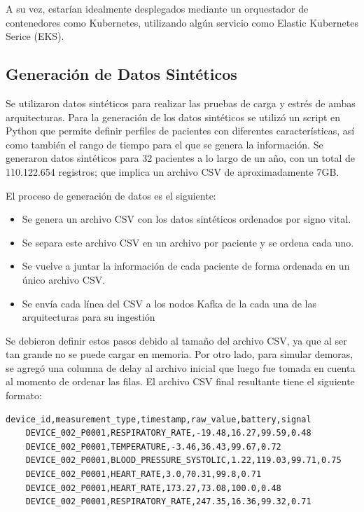 A su vez, estarían idealmente desplegados mediante un orquestador de contenedores como Kubernetes, utilizando algún servicio como Elastic Kubernetes Serice (EKS).

\newpage

\subsection{Generación de Datos Sintéticos}

Se utilizaron datos sintéticos para realizar las pruebas de carga y estrés de ambas arquitecturas.
Para la generación de los datos sintéticos se utilizó un script en Python que permite definir perfiles de pacientes con diferentes características,
así como también el rango de tiempo para el que se genera la información.
Se generaron datos sintéticos para 32 pacientes a lo largo de un año, con un total de 110.122.654 registros;
que implica un archivo CSV de aproximadamente 7GB.

El proceso de generación de datos es el siguiente:
\begin{itemize}
    \item Se genera un archivo CSV con los datos sintéticos ordenados por signo vital.
    \item Se separa este archivo CSV en un archivo por paciente y se ordena cada uno.
    \item Se vuelve a juntar la información de cada paciente de forma ordenada en un único archivo CSV.
    \item Se envía cada línea del CSV a los nodos Kafka de la cada una de las arquitecturas para su ingestión
\end{itemize}


Se debieron definir estos pasos debido al tamaño del archivo CSV, ya que al ser tan grande no se puede cargar en memoria.
Por otro lado, para simular demoras, se agregó una columna de delay al archivo inicial que luego fue tomada en cuenta al momento de ordenar las filas. 
El archivo CSV final resultante tiene el siguiente formato:
\begin{lstlisting}[language=CSV]
    device_id,measurement_type,timestamp,raw_value,battery,signal
    DEVICE_002_P0001,RESPIRATORY_RATE,-19.48,16.27,99.59,0.48
    DEVICE_002_P0001,TEMPERATURE,-3.46,36.43,99.67,0.72
    DEVICE_002_P0001,BLOOD_PRESSURE_SYSTOLIC,1.22,119.03,99.71,0.75
    DEVICE_002_P0001,HEART_RATE,3.0,70.31,99.8,0.71
    DEVICE_002_P0001,HEART_RATE,173.27,73.08,100.0,0.48
    DEVICE_002_P0001,RESPIRATORY_RATE,247.35,16.36,99.32,0.71
\end{lstlisting}

